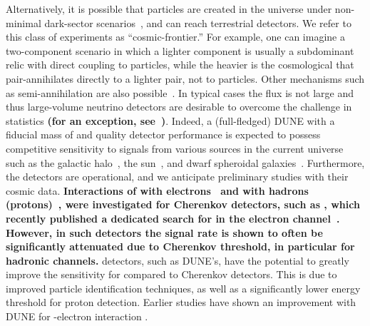 Alternatively, it is possible that  particles are created in the universe under non-minimal dark-sector scenarios~\cite{Agashe:2014yua,Belanger:2011ww}, and can reach terrestrial detectors. 
We %
refer to this class of experiments as ``cosmic-frontier.'' %
For example, one can imagine a two-component  %
scenario in which a lighter component is usually a subdominant relic with direct coupling to  particles, while the heavier is the cosmological  that pair-annihilates directly to a lighter  pair, not to  particles. Other mechanisms such as semi-annihilation are also possible~\cite{Carlson:1992fn, Hochberg:2014dra,Huang:2013xfa,Berger:2014sqa,Kong:2014mia}.
In typical cases the  flux is not large and thus large-volume neutrino detectors are desirable %
to overcome the challenge in statistics {\bf (for an  exception, see~\cite{Cherry:2015oca, Cui:2017ytb})}.
Indeed, a (full-fledged) DUNE  with a fiducial mass of \fdfiducialmass and quality detector performance is expected to possess competitive sensitivity to  signals from various sources in the current universe such as the galactic halo~\cite{Agashe:2014yua,
Alhazmi:2016qcs,Kim:2016zjx,Giudice:2017zke,Chatterjee:2018mej,Kim:2018veo}, the sun~\cite{Huang:2013xfa,Berger:2014sqa,Kong:2014mia,Kim:2018veo}, and dwarf spheroidal galaxies~\cite{Necib:2016aez}. 
Furthermore, the  detectors %
are operational, and we anticipate preliminary studies with their cosmic data. {\bf Interactions of  with electrons~\cite{Agashe:2014yua} 
and with hadrons (protons)~\cite{Berger:2014sqa}, were investigated for Cherenkov detectors, such as \superk, which recently published a dedicated search for  in the electron channel~\cite{Kachulis:2017nci}. However, in such detectors the  signal rate is shown to  often be significantly attenuated due to Cherenkov threshold, in particular for hadronic channels.}  \lar detectors, such as DUNE's, have the potential to greatly improve the sensitivity for  compared to Cherenkov detectors. This is due to improved particle identification techniques, as well as a significantly lower energy threshold for proton detection. Earlier studies have shown an improvement with DUNE for -electron interaction \cite{Necib:2016aez}.

